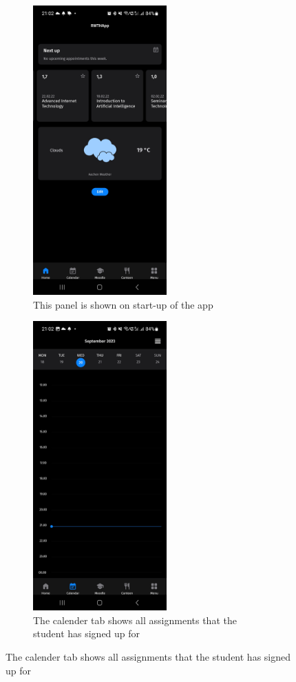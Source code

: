 \begin{figure}[t!]
	\centering
	\begin{subfigure}[T]{0.3\linewidth}
		\includegraphics[height=30em]{figures/Screenshot_main_RWTHApp.jpg}
		\caption{This panel is shown on start-up of the app}
		\label{fig:app_main}
	\end{subfigure}
	\hfill
	\begin{subfigure}[T]{0.3\linewidth}
		\includegraphics[height=30em]{figures/Screenshot_calender_RWTHApp.jpg}
		\caption{The calender tab shows all assignments that the student has signed up for}

\end{subfigure}
\end{figure}
